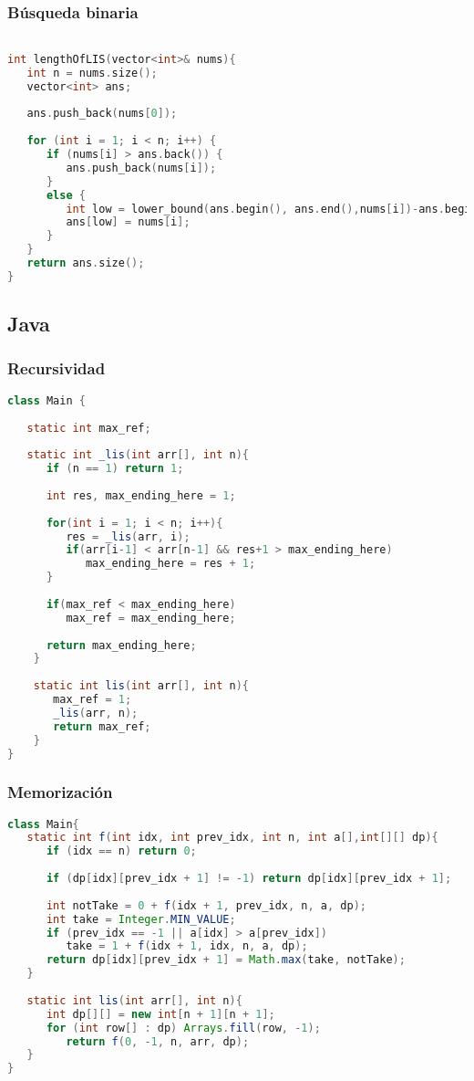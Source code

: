 \subsubsection{Búsqueda binaria}
\begin{lstlisting}[language=C++]

int lengthOfLIS(vector<int>& nums){
   int n = nums.size();
   vector<int> ans;
	
   ans.push_back(nums[0]);
	
   for (int i = 1; i < n; i++) {
      if (nums[i] > ans.back()) {
         ans.push_back(nums[i]);
      }
      else {
         int low = lower_bound(ans.begin(), ans.end(),nums[i])-ans.begin();
         ans[low] = nums[i];
      }
   }
   return ans.size();
}
\end{lstlisting}


\subsection{Java}

\subsubsection{Recursividad}
\begin{lstlisting}[language=Java]
class Main {
	
   static int max_ref;
	
   static int _lis(int arr[], int n){
      if (n == 1) return 1;
      
      int res, max_ending_here = 1;
		
      for(int i = 1; i < n; i++){
         res = _lis(arr, i);
         if(arr[i-1] < arr[n-1] && res+1 > max_ending_here)
            max_ending_here = res + 1;
      }
		
      if(max_ref < max_ending_here)
         max_ref = max_ending_here;
		
      return max_ending_here;
    }
	
    static int lis(int arr[], int n){
       max_ref = 1;
       _lis(arr, n);
       return max_ref;
    }
}
\end{lstlisting}

\subsubsection{Memorización}
\begin{lstlisting}[language=Java]
class Main{
   static int f(int idx, int prev_idx, int n, int a[],int[][] dp){
      if (idx == n) return 0;
		
      if (dp[idx][prev_idx + 1] != -1) return dp[idx][prev_idx + 1];
      
      int notTake = 0 + f(idx + 1, prev_idx, n, a, dp);
      int take = Integer.MIN_VALUE;
      if (prev_idx == -1 || a[idx] > a[prev_idx]) 
         take = 1 + f(idx + 1, idx, n, a, dp);
      return dp[idx][prev_idx + 1] = Math.max(take, notTake);
   }
	
   static int lis(int arr[], int n){
      int dp[][] = new int[n + 1][n + 1];
      for (int row[] : dp) Arrays.fill(row, -1);
         return f(0, -1, n, arr, dp);
   }
}
\end{lstlisting}

